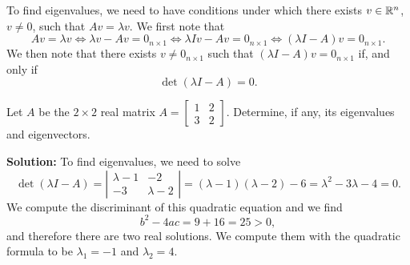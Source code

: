 \vspace*{.2cm}

To find eigenvalues, we need to have conditions under which there exists $v \in \mathbb R^n$, $v \neq 0$, such that $A v=\lambda v$. We first note that 
$$A  v=\lambda v \iff \lambda v -Av = 0_{n \times 1} \iff \lambda I v -Av = 0_{n \times 1}  \iff(\lambda I-A) v=0_{n \times 1}.$$
We then note that there exists $v \neq 0_{n \times 1}$ such that $(\lambda I-A) v=0_{n \times 1}$ if, and only if 
    \begin{equation*}
   \det(\lambda I-A)=0.
    \end{equation*}
    
    \begin{example}
\label{ex:Chap10Eigen01} Let $A$ be the $2 \times 2$ real matrix
 $A=\left[\begin{array}{rr}
    1 & 2\\
    3 & 2
    \end{array}\right].$
Determine, if any, its eigenvalues and eigenvectors. 
\end{example}

\textbf{Solution:} To find eigenvalues, we need to solve 
$$\det(\lambda I-A)= \left| \begin{array}{cc}
    \lambda-1 & -2\\
   -3 &\lambda -2
    \end{array} \right| =(\lambda-1)(\lambda-2)-6=\lambda^2- 3 \lambda -4=0.$$
    We compute the discriminant of this quadratic equation and we find
    $$b^2-4ac = 9 +16 =25 >0,$$
    and therefore there are two real solutions. We compute them with the quadratic formula to be $\lambda_1=-1$ and $\lambda_2=4$.\\
    
